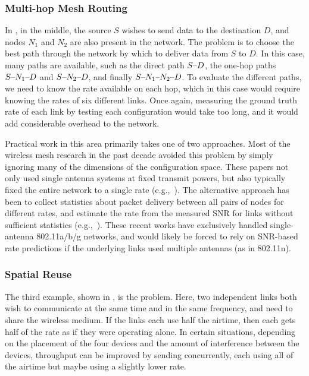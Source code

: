 \subsubsection{Multi-hop Mesh Routing}
In , in the middle, the source $S$ wishes to send data to the destination $D$, and nodes $N_1$ and $N_2$ are also present in the network. The  problem is to choose the best path through the network by which to deliver data from $S$ to $D$. In this case, many paths are available, such as the direct path $S\textnormal{--} D$, the one-hop paths $S\textnormal{--} N_1\textnormal{--} D$ and $S\textnormal{--} N_2\textnormal{--} D$, and finally $S\textnormal{--} N_1\textnormal{--} N_2\textnormal{--} D$. To evaluate the different paths, we need to know the rate available on each hop, which in this case would require knowing the rates of six different links. Once again, measuring the ground truth rate of each link by testing each configuration would take too long, and it would add considerable overhead to the network.

Practical work in this area primarily takes one of two approaches. Most of the wireless mesh research in the past decade avoided this problem by simply ignoring many of the dimensions of the configuration space. These papers not only used single antenna systems at fixed transmit powers, but also typically fixed the entire network to a single rate (e.g.,~\cite{Katti_ANC,Katti_MIXIT,Katti_XORs,Chachulski_MORE,Biswas_ExOR}). The alternative approach has been to collect statistics about packet delivery between all pairs of nodes for different rates, and estimate the rate from the measured SNR for links without sufficient statistics (e.g.,~\cite{Bahl_repeater}). These recent works have exclusively handled single-antenna 802.11a/b/g networks, and would likely be forced to rely on SNR-based rate predictions if the underlying links used multiple antennas (as in 802.11n).

\subsubsection{Spatial Reuse}
The third example, shown in , is the  problem. Here, two independent links both wish to communicate at the same time and in the same frequency, and need to share the wireless medium. If the links each use half the airtime, then each gets half of the rate as if they were operating alone. In certain situations, depending on the placement of the four devices and the amount of interference between the devices, throughput can be improved by sending concurrently, each using all of the airtime but maybe using a slightly lower rate.


